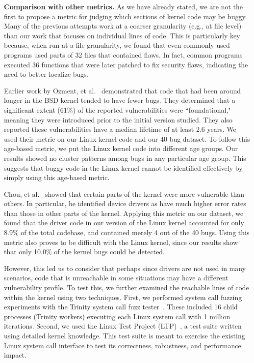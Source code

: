 \textbf{Comparison with other metrics.}
As we have already stated, we are not the first to propose a metric for judging
which sections of kernel code may be buggy.
Many of the previous attempts work at a coarser granularity (e.g., at file level)
than our work that focuses on
individual lines of code.  This is particularly key because, when run at a file
granularity, we found that even commonly used programs used parts of
32 files that contained flaws. In fact, common
programs executed 36 functions that were later patched to fix security
flaws, indicating the need to better localize bugs.

Earlier work by Ozment, et al.~\cite{ozment2006milk} demonstrated that code that
had been around longer in the BSD kernel tended to have fewer bugs.
They determined that a significant extent (61\%) of the reported
vulnerabilities were ``foundational," meaning they were introduced prior to the
initial version studied. They also reported these vulnerabilities
have a median lifetime of at least 2.6 years.
We used their metric on our Linux kernel code and our 40 bug dataset.
To follow this age-based metric, we put the Linux kernel code into different age groups.
Our results showed no cluster patterns among bugs in any particular age group.
This suggests that buggy code in the Linux kernel cannot be identified effectively
by simply using this age-based metric. 

Chou, et al.~\cite{PittSFIeld} showed that certain parts of the kernel
were more vulnerable than others. In particular, he identified device drivers as
have much higher error rates than those in other parts of the kernel.
Applying this metric on our dataset, we found that the driver code in our version
of the Linux kernel accounted for only 8.9\% of the total codebase, and contained
merely 4 out of the 40 bugs. Using this metric also proves to be difficult with the
Linux kernel, since our results show that
only 10.0\% of the kernel bugs could be detected.

However, this led us to consider that perhaps since drivers are not used
in many scenarios, code that is unreachable in some situations may have a
different vulnerability profile.  To test this, we
further examined the reachable lines of
code within the kernel using two techniques. First,
we performed system call fuzzing experiments with the Trinity
system call fuzz tester~\cite{Trinity}. These included 16 child processes
(Trinity workers) executing each Linux system call with 1 million iterations.
Second, we used the Linux Test Project (LTP)~\cite{LTP}, a test suite written
using detailed kernel knowledge. This test suite is meant to exercise the
existing Linux system call interface to
test its correctness, robustness, and performance impact.

